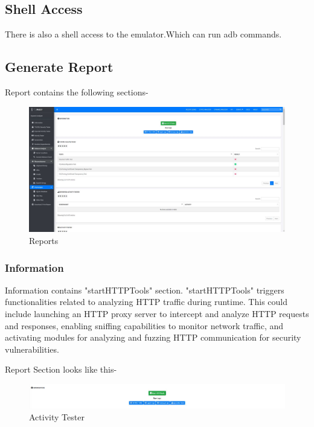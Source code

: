 \documentclass{report}
\begin{document}
\subsection{Shell Access}
There is also a shell access to the emulator.Which can run adb commands.

\subsection{Generate Report}
Report contains the following sections-
\begin{figure}[hbt!]
    \centering
    \includegraphics[width=1\linewidth]{Dynamic Analyzer/generate_report.jpg}
    \caption{Reports}
    \label{fig:example}
\end{figure}
\FloatBarrier

\subsubsection{Information}
Information contains "startHTTPTools" section. "startHTTPTools" triggers functionalities related to analyzing HTTP traffic during runtime. This could include launching an HTTP proxy server to intercept and analyze HTTP requests and responses, enabling sniffing capabilities to monitor network traffic, and activating modules for analyzing and fuzzing HTTP communication for security vulnerabilities.

Report Section looks like this-
\begin{figure}[hbt!]
    \centering
    \includegraphics[width=1\linewidth]{Dynamic Analyzer/info.jpg}
    \caption{Activity Tester}
    \label{fig:example}
\end{figure}
\FloatBarrier
\end{document}
